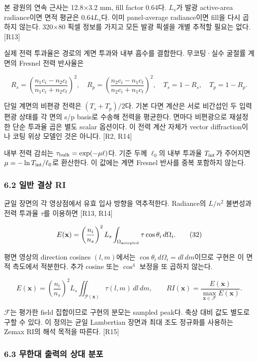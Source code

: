 \documentclass[
  a4paper,
]{article}
\begin{document}
본 광원의 연속 근사는 12.8×3.2 mm, fill factor 0.64다. \(L_s\)가 발광
active-area radiance이면 면적 평균은 \(0.64L_s\)다. 이미 panel-average
radiance이면 fill을 다시 곱하지 않는다. 320×80 픽셀 정보를 가지고 모든
발광 픽셀을 개별 추적할 필요는 없다. {[}R13{]}

실제 전력 투과율은 경로의 계면 투과와 내부 흡수를 결합한다. 무코팅·실수
굴절률 계면의 Fresnel 전력 반사율은

\[
R_s=\left(\frac{n_1c_i-n_2c_t}{n_1c_i+n_2c_t}\right)^2,
\quad R_p=\left(\frac{n_2c_i-n_1c_t}{n_2c_i+n_1c_t}\right)^2,
\quad T_s=1-R_s,\quad T_p=1-R_p.
\tag{31}
\]

단일 계면의 비편광 전력은 \((T_s+T_p)/2\)다. 기본 다면 계산은 서로
비간섭인 두 입력 편광 상태를 각 면의 s/p basis로 수송해 전력을 평균한다.
면마다 비편광으로 재설정한 단순 투과율 곱은 별도 scalar 옵션이다. 이
전력 계산 자체가 vector diffraction이나 코팅 위상 모델인 것은 아니다.
{[}R2, R14{]}

내부 전력 감쇠는 \(\tau_{\rm bulk}=\exp(-\mu\ell)\)다. 기준 두께
\(\ell_0\)의 내부 투과율 \(T_{\rm int}\)가 주어지면
\(\mu=-\ln T_{\rm int}/\ell_0\)로 환산한다. 이 값에는 계면 Fresnel
반사를 중복 포함하지 않는다.

\hypertarget{uxc77cuxbc18-uxacb0uxc0c1-ri}{%
\subsubsection{6.2 일반 결상 RI}\label{uxc77cuxbc18-uxacb0uxc0c1-ri}}

균일 장면의 각 영상점에서 유효 입사 방향을 역추적한다. Radiance의
\(L/n^2\) 불변성과 전력 투과율 \(\tau\)를 이용하면 {[}R13, R14{]}

\[
E(\mathbf x)=\left(\frac{n_i}{n_s}\right)^2L_s
 \int_{\Omega_{\rm accepted}}\tau\cos\theta_i\,d\Omega_i.
\tag{32}
\]

평면 영상의 direction cosines \((l,m)\)에서는
\(\cos\theta_i\,d\Omega_i=dl\,dm\)이므로 구현은 이 면적 측도에서
적분한다. 추가 cosine 또는 \(\cos^4\) 보정을 또 곱하지 않는다.

\[
E(\mathbf x)=\left(\frac{n_i}{n_s}\right)^2L_s
 \iint_{\mathcal P(\mathbf x)}\tau(l,m)\,dl\,dm,
\qquad RI(\mathbf x)=\frac{E(\mathbf x)}{\max_{\mathbf x\in\mathcal F}E(\mathbf x)}.
\tag{33}
\]

\(\mathcal F\)는 평가한 field 집합이므로 구현의 분모는 sampled peak다.
축상 대비 값도 별도로 구할 수 있다. 이 정의는 균일 Lambertian 장면과
최대 조도 정규화를 사용하는 Zemax RI의 해석 목적을 따른다. {[}R15{]}

\hypertarget{uxbb34uxd55cuxb300-uxcd9cuxb825uxc758-uxc0c1uxb300-uxbd84uxd3ec}{%
\subsubsection{6.3 무한대 출력의 상대
분포}\label{uxbb34uxd55cuxb300-uxcd9cuxb825uxc758-uxc0c1uxb300-uxbd84uxd3ec}}
\end{document}
